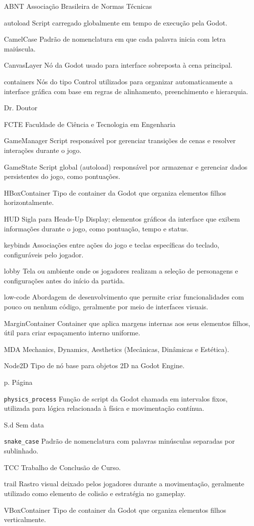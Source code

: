 \begin{siglas}
  \item[ABNT] Associação Brasileira de Normas Técnicas
  \item[autoload] Script carregado globalmente em tempo de execução pela Godot.
  \item[CamelCase] Padrão de nomenclatura em que cada palavra inicia com letra maiúscula.
  \item[CanvasLayer] Nó da Godot usado para interface sobreposta à cena principal.
  \item[containers] Nós do tipo Control utilizados para organizar automaticamente a interface gráfica com base em regras de alinhamento, preenchimento e hierarquia.
  \item[Dr.] Doutor
  \item[FCTE] Faculdade de Ciência e Tecnologia em Engenharia
  \item[GameManager] Script responsável por gerenciar transições de cenas e resolver interações durante o jogo.
  \item[GameState] Script global (autoload) responsável por armazenar e gerenciar dados persistentes do jogo, como pontuações.
  \item[HBoxContainer] Tipo de container da Godot que organiza elementos filhos horizontalmente.
  \item[HUD] Sigla para Heads-Up Display; elementos gráficos da interface que exibem informações durante o jogo, como pontuação, tempo e status.
  \item[keybinds] Associações entre ações do jogo e teclas específicas do teclado, configuráveis pelo jogador.
  \item[lobby] Tela ou ambiente onde os jogadores realizam a seleção de personagens e configurações antes do início da partida.
  \item[low-code] Abordagem de desenvolvimento que permite criar funcionalidades com pouco ou nenhum código, geralmente por meio de interfaces visuais.
  \item[MarginContainer] Container que aplica margens internas aos seus elementos filhos, útil para criar espaçamento interno uniforme.
  \item[MDA] Mechanics, Dynamics, Aesthetics (Mecânicas, Dinâmicas e Estética).
  \item[Node2D] Tipo de nó base para objetos 2D na Godot Engine.
  \item[p.] Página
  \item[\texttt{physics\_process}] Função de script da Godot chamada em intervalos fixos, utilizada para lógica relacionada à física e movimentação contínua.
  \item[S.d] Sem data
  \item[\texttt{snake\_case}] Padrão de nomenclatura com palavras minúsculas separadas por sublinhado.
  \item[TCC] Trabalho de Conclusão de Curso.
  \item[trail] Rastro visual deixado pelos jogadores durante a movimentação, geralmente utilizado como elemento de colisão e estratégia no gameplay.
  \item[VBoxContainer] Tipo de container da Godot que organiza elementos filhos verticalmente.
\end{siglas}
